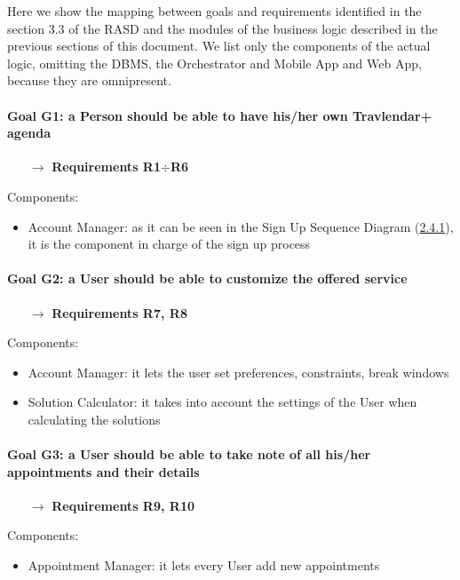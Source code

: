 \newcommand{\requirements}[1]{
	\begin{itemize}
		\item[$\rightarrow$] \textbf{Requirements #1}\mbox{} %
	\end{itemize}
}

Here we show the mapping between goals and requirements identified in the section 3.3 of the RASD and the modules of the business logic described in the previous sections of this document. We list only the components of the actual logic, omitting the DBMS, the Orchestrator and Mobile App and Web App, because they are omnipresent.

\paragraph{Goal G1: a Person should be able to have his/her own Travlendar+ agenda}
	\requirements{R1$\div$R6}
	Components:
	\begin{itemize}[label=--]
		\item Account Manager: as it can be seen in the Sign Up Sequence Diagram (\hyperref[sect:sd_signUp]{2.4.1}), it is the component in charge of the sign up process
	\end{itemize}

\paragraph{Goal G2: a User should be able to customize the offered service}
	\requirements{R7, R8}
	Components:
	\begin{itemize}[label=--]
		\item Account Manager: it lets the user set preferences, constraints, break windows
		\item Solution Calculator: it takes into account the settings of the User when calculating the solutions
	\end{itemize}

\paragraph{Goal G3: a User should be able to take note of all his/her appointments and their details}
	\requirements{R9, R10}
	Components:
	\begin{itemize}[label=--]
		\item Appointment Manager: it lets every User add new appointments
	\end{itemize}

